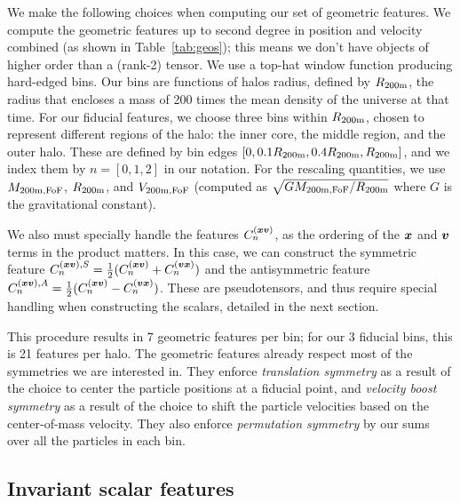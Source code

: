 We make the following choices when computing our set of geometric features.
We compute the geometric features up to second degree in position and velocity combined (as shown in Table~\ref{tab:geos}); this means we don't have objects of higher order than a (rank-2) tensor.
We use a top-hat window function producing hard-edged bins. 
Our bins are functions of halos radius, defined by $R_\mathrm{200m}$, the radius that encloses a mass of 200 times the mean density of the universe at that time.
For our fiducial features, we choose three bins within $R_\mathrm{200m}$, chosen to represent different regions of the halo: the inner core, the middle region, and the outer halo.
These are defined by bin edges $[0, 0.1R_\mathrm{200m}, 0.4R_\mathrm{200m}, R_\mathrm{200m}]$, and we index them by $n=[0,1,2]$ in our notation.
For the rescaling quantities, we use $M_\mathrm{200m,FoF}$, $R_\mathrm{200m}$, and $V_\mathrm{200m,FoF}$ (computed as $\sqrt{GM_\mathrm{200m,FoF}/R_\mathrm{200m}}$ where $G$ is the gravitational constant).

We also must specially handle the features $C^{(\bm{x}\bm{v})}_n$, as the ordering of the $\bm{x}$ and $\bm{v}$ terms in the product matters.
In this case, we can construct the symmetric feature $ C^{(\bm{x}\bm{v}),S}_n = \frac{1}{2} (C^{(\bm{x}\bm{v})}_n + C^{(\bm{v}\bm{x})}_n)$ and the antisymmetric feature $C^{(\bm{x}\bm{v}),A}_n = \frac{1}{2} (C^{(\bm{x}\bm{v})}_n - C^{(\bm{v}\bm{x})}_n)$.
These are pseudotensors, and thus require special handling when constructing the scalars, detailed in the next section.

This procedure results in 7 geometric features per bin; for our 3 fiducial bins, this is 21 features per halo.
The geometric features already respect most of the symmetries we are interested in.
They enforce \emph{translation symmetry} as a result of the choice to center the particle positions at a fiducial point, and \emph{velocity boost symmetry} as a result of the choice to shift the particle velocities based on the center-of-mass velocity.  
They also enforce \emph{permutation symmetry} by our sums over all the particles in each bin.


\subsection{Invariant scalar features}
\label{sec:scalar_features}

